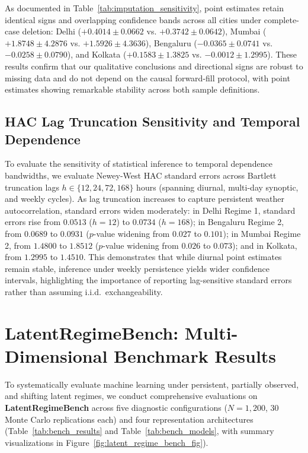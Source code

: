 \documentclass[twoside]{article}
\theoremstyle{definition}
\begin{document}
As documented in Table~\ref{tab:imputation_sensitivity}, point estimates retain identical signs and overlapping confidence bands across all cities under complete-case deletion: Delhi ($+0.4014 \pm 0.0662$ vs. $+0.3742 \pm 0.0642$), Mumbai ($+1.8748 \pm 4.2876$ vs. $+1.5926 \pm 4.3636$), Bengaluru ($-0.0365 \pm 0.0741$ vs. $-0.0258 \pm 0.0790$), and Kolkata ($+0.1583 \pm 1.3825$ vs. $-0.0012 \pm 1.2995$). These results confirm that our qualitative conclusions and directional signs are robust to missing data and do not depend on the causal forward-fill protocol, with point estimates showing remarkable stability across both sample definitions.

\subsection{HAC Lag Truncation Sensitivity and Temporal Dependence}
\label{app:hac_frozen_sensitivity}
To evaluate the sensitivity of statistical inference to temporal dependence bandwidths, we evaluate Newey-West HAC standard errors across Bartlett truncation lags $h \in \{12, 24, 72, 168\}$ hours (spanning diurnal, multi-day synoptic, and weekly cycles). As lag truncation increases to capture persistent weather autocorrelation, standard errors widen moderately: in Delhi Regime 1, standard errors rise from $0.0513$ ($h=12$) to $0.0734$ ($h=168$); in Bengaluru Regime 2, from $0.0689$ to $0.0931$ ($p$-value widening from $0.027$ to $0.101$); in Mumbai Regime 2, from $1.4800$ to $1.8512$ ($p$-value widening from $0.026$ to $0.073$); and in Kolkata, from $1.2995$ to $1.4510$. This demonstrates that while diurnal point estimates remain stable, inference under weekly persistence yields wider confidence intervals, highlighting the importance of reporting lag-sensitive standard errors rather than assuming i.i.d.\ exchangeability.

\vspace{-2mm}
\section{LatentRegimeBench: Multi-Dimensional Benchmark Results}
\label{app:latent_regime_bench}
To systematically evaluate machine learning under persistent, partially observed, and shifting latent regimes, we conduct comprehensive evaluations on \textbf{LatentRegimeBench} across five diagnostic configurations ($N=1,200$, $30$ Monte Carlo replications each) and four representation architectures (Table~\ref{tab:bench_results} and Table~\ref{tab:bench_models}, with summary visualizations in Figure~\ref{fig:latent_regime_bench_fig}).
\end{document}
